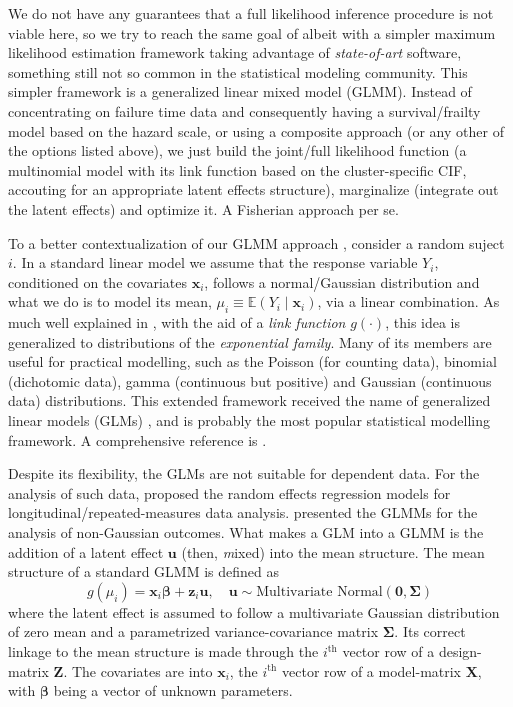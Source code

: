 We do not have any guarantees that a full likelihood inference procedure
is not viable here, so we try to reach the same goal of
 albeit with a simpler maximum likelihood estimation
framework taking advantage of \textit{state-of-art} software, something
still not so common in the statistical modeling community. This simpler
framework is a generalized linear mixed model (GLMM). Instead of
concentrating on failure time data and consequently having a
survival/frailty model based on the hazard scale, or using a composite
approach (or any other of the options listed above), we just build the
joint/full likelihood function (a multinomial model with its link
function based on the cluster-specific CIF, accouting for an appropriate
latent effects structure), marginalize (integrate out the latent
effects) and optimize it. A Fisherian approach per se.

To a better contextualization of our GLMM approach \cite{GLMM}, consider
a random suject \(i\). In a standard linear model we assume that the
response variable \(Y_{i}\), conditioned on the covariates
\(\bm{x}_{i}\), follows a normal/Gaussian distribution and what we do is
to model its mean, \(\mu_{i} \equiv \mathbb{E}(Y_{i} \mid \bm{x}_{i})\),
via a linear combination. As much well explained in ,
with the aid of a \textit{link function} \(g(\cdot)\), this idea is
generalized to distributions of the \textit{exponential family}. Many of
its members are useful for practical modelling, such as the Poisson (for
counting data), binomial (dichotomic data), gamma (continuous but
positive) and Gaussian (continuous data) distributions. This extended
framework received the name of generalized linear models
(GLMs) \cite{GLM72}, and is probably the most popular statistical
modelling framework. A comprehensive reference is .

 Despite its flexibility, the GLMs are not suitable for dependent
data. For the analysis of such data,  proposed the
random effects regression models for longitudinal/repeated-measures data
analysis.  presented the GLMMs for the analysis of
non-Gaussian outcomes. What makes a GLM into a GLMM is the addition of a
latent effect \(\bm{u}\) (then, \textit{m}ixed) into the mean
structure. The mean structure of a standard GLMM is defined as
\[
  g(\mu_{i}) = \bm{x}_{i}\bm{\beta} + \bm{z}_{i}\bm{u},
  \quad \bm{u} \sim \text{Multivariate Normal}(\bm{0},\bm{\Sigma})
\]
where the latent effect is assumed to follow a multivariate Gaussian
distribution of zero mean and a parametrized variance-covariance matrix
\(\bm{\Sigma}\). Its correct linkage to the mean structure is made
through the \(i^\text{th}\) vector row of a design-matrix \(\bm{Z}\).
The covariates are into \(\bm{x}_{i}\), the \(i^\text{th}\) vector row
of a model-matrix \(\bm{X}\), with \(\bm{\beta}\) being a vector of
unknown parameters.

